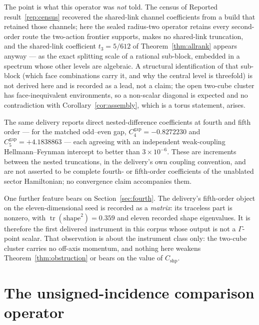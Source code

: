 \documentclass[11pt]{article}
\theoremstyle{plain}
\theoremstyle{definition}
\theoremstyle{remark}
\newcommand{\chk}[1]{}
\begin{document}
The point is what this operator was \emph{not} told. The census of
Reported result~\ref{rep:census} recovered the shared-link channel
coefficients from a build that retained those channels; here the sealed
radius-two operator retains every second-order route the two-action frontier
supports, makes no shared-link truncation, and the shared-link coefficient
$t_3=5/612$ of Theorem~\ref{thm:allrank} appears anyway --- as the exact
splitting scale of a rational sub-block, embedded in a spectrum whose other
levels are algebraic. A structural identification of that sub-block (which
face combinations carry it, and why the central level is threefold) is not
derived here and is recorded as a lead, not a claim; the open two-cube
cluster has face-inequivalent environments, so a non-scalar diagonal is
expected and no contradiction with Corollary~\ref{cor:assembly}, which is a
torus statement, arises.
\chk{the sealed radius-two report passes its six float checks at stated tolerances}


The same delivery reports direct nested-difference coefficients at fourth
and fifth order --- for the matched odd--even gap,
$C_4^{\mathrm{gap}}=-0.8272230$ and $C_5^{\mathrm{gap}}=+4.1838863$ --- each
agreeing with an independent weak-coupling Hellmann--Feynman intercept to
better than $3\times10^{-6}$. These are increments between the nested
truncations, in the delivery's own coupling convention, and are not asserted
to be complete fourth- or fifth-order coefficients of the unablated sector
Hamiltonian; no convergence claim accompanies them.
\chk{the sealed radius-two report passes its six float checks at stated tolerances}

One further feature bears on Section~\ref{sec:fourth}. The delivery's
fifth-order object on the eleven-dimensional seed is recorded as a
\emph{matrix}: its traceless part is nonzero, with
$\operatorname{tr}(\mathrm{shape}^2)=0.359$ and eleven recorded shape
eigenvalues. It is therefore the first delivered instrument in this corpus
whose output is not a $\Gamma$-point scalar. That observation is about the
instrument class only: the two-cube cluster carries no off-axis momentum,
and nothing here weakens Theorem~\ref{thm:obstruction} or bears on the value
of $C_{\mathrm{shp}}$.
\chk{the sealed radius-two report passes its six float checks at stated tolerances}

\section{The unsigned-incidence comparison operator}
\label{sec:even}
\end{document}
